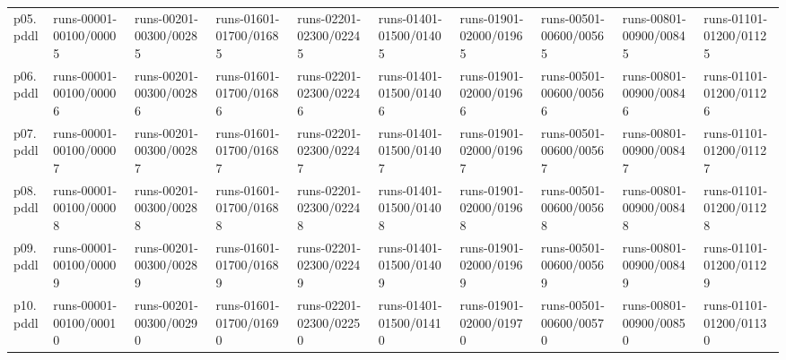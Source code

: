 \documentclass{article}
\begin{document}
\begin{tabular}{@{}lrrrrrrrrr@{}}
p05.pddl & \multicolumn{1}{|l|}{runs-00001-00100/00005} & \multicolumn{1}{|l|}{runs-00201-00300/00285} & \multicolumn{1}{|l|}{runs-01601-01700/01685} & \multicolumn{1}{|l|}{runs-02201-02300/02245} & \multicolumn{1}{|l|}{runs-01401-01500/01405} & \multicolumn{1}{|l|}{runs-01901-02000/01965} & \multicolumn{1}{|l|}{runs-00501-00600/00565} & \multicolumn{1}{|l|}{runs-00801-00900/00845} & \multicolumn{1}{|l|}{runs-01101-01200/01125} \\
p06.pddl & \multicolumn{1}{|l|}{runs-00001-00100/00006} & \multicolumn{1}{|l|}{runs-00201-00300/00286} & \multicolumn{1}{|l|}{runs-01601-01700/01686} & \multicolumn{1}{|l|}{runs-02201-02300/02246} & \multicolumn{1}{|l|}{runs-01401-01500/01406} & \multicolumn{1}{|l|}{runs-01901-02000/01966} & \multicolumn{1}{|l|}{runs-00501-00600/00566} & \multicolumn{1}{|l|}{runs-00801-00900/00846} & \multicolumn{1}{|l|}{runs-01101-01200/01126} \\
p07.pddl & \multicolumn{1}{|l|}{runs-00001-00100/00007} & \multicolumn{1}{|l|}{runs-00201-00300/00287} & \multicolumn{1}{|l|}{runs-01601-01700/01687} & \multicolumn{1}{|l|}{runs-02201-02300/02247} & \multicolumn{1}{|l|}{runs-01401-01500/01407} & \multicolumn{1}{|l|}{runs-01901-02000/01967} & \multicolumn{1}{|l|}{runs-00501-00600/00567} & \multicolumn{1}{|l|}{runs-00801-00900/00847} & \multicolumn{1}{|l|}{runs-01101-01200/01127} \\
p08.pddl & \multicolumn{1}{|l|}{runs-00001-00100/00008} & \multicolumn{1}{|l|}{runs-00201-00300/00288} & \multicolumn{1}{|l|}{runs-01601-01700/01688} & \multicolumn{1}{|l|}{runs-02201-02300/02248} & \multicolumn{1}{|l|}{runs-01401-01500/01408} & \multicolumn{1}{|l|}{runs-01901-02000/01968} & \multicolumn{1}{|l|}{runs-00501-00600/00568} & \multicolumn{1}{|l|}{runs-00801-00900/00848} & \multicolumn{1}{|l|}{runs-01101-01200/01128} \\
p09.pddl & \multicolumn{1}{|l|}{runs-00001-00100/00009} & \multicolumn{1}{|l|}{runs-00201-00300/00289} & \multicolumn{1}{|l|}{runs-01601-01700/01689} & \multicolumn{1}{|l|}{runs-02201-02300/02249} & \multicolumn{1}{|l|}{runs-01401-01500/01409} & \multicolumn{1}{|l|}{runs-01901-02000/01969} & \multicolumn{1}{|l|}{runs-00501-00600/00569} & \multicolumn{1}{|l|}{runs-00801-00900/00849} & \multicolumn{1}{|l|}{runs-01101-01200/01129} \\
p10.pddl & \multicolumn{1}{|l|}{runs-00001-00100/00010} & \multicolumn{1}{|l|}{runs-00201-00300/00290} & \multicolumn{1}{|l|}{runs-01601-01700/01690} & \multicolumn{1}{|l|}{runs-02201-02300/02250} & \multicolumn{1}{|l|}{runs-01401-01500/01410} & \multicolumn{1}{|l|}{runs-01901-02000/01970} & \multicolumn{1}{|l|}{runs-00501-00600/00570} & \multicolumn{1}{|l|}{runs-00801-00900/00850} & \multicolumn{1}{|l|}{runs-01101-01200/01130} \\

\end{tabular}
\end{document}
